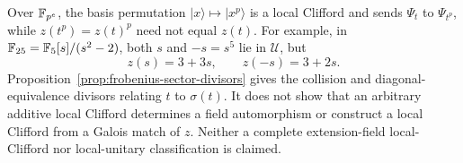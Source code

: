 Over \(\mathbb F_{p^e}\), the basis permutation
\(\lvert x\rangle\mapsto\lvert x^p\rangle\) is a local Clifford and sends
\(\Psi_t\) to \(\Psi_{t^p}\), while \(z(t^p)=z(t)^p\) need not equal
\(z(t)\).  For example, in \(\mathbb F_{25}=\mathbb F_5[s]/(s^2-2)\), both \(s\) and
\(-s=s^5\) lie in \(\mathcal U\), but
\[
 z(s)=3+3s,\qquad z(-s)=3+2s.
\]
Proposition~\ref{prop:frobenius-sector-divisors} gives the collision and
diagonal-equivalence divisors relating \(t\) to \(\sigma(t)\).  It does not
show that an arbitrary additive local Clifford determines a field
automorphism or construct a local Clifford from a Galois match of \(z\).
Neither a complete extension-field local-Clifford nor local-unitary
classification is claimed.
